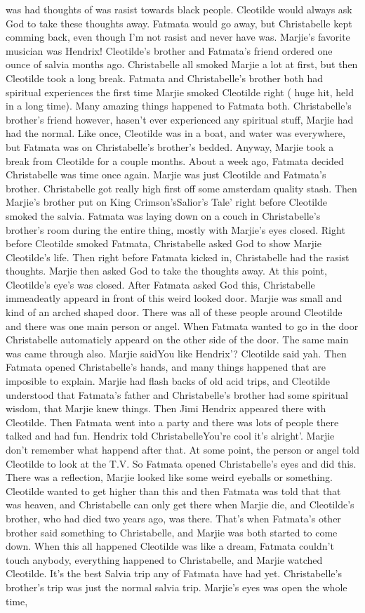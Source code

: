 \documentclass[12pt]{book}
\begin{document}
was had thoughts of was rasist towards black people. Cleotilde would always ask God to take these thoughts away. Fatmata would go away, but Christabelle kept comming back, even though I'm not rasist and never have was. Marjie's favorite musician was Hendrix! Cleotilde's brother and Fatmata's friend ordered one ounce of salvia months ago. Christabelle all smoked Marjie a lot at first, but then Cleotilde took a long break. Fatmata and Christabelle's brother both had spiritual experiences the first time Marjie smoked Cleotilde right ( huge hit, held in a long time). Many amazing things happened to Fatmata both. Christabelle's brother's friend however, hasen't ever experienced any spiritual stuff, Marjie had had the normal. Like once, Cleotilde was in a boat, and water was everywhere, but Fatmata was on Christabelle's brother's bedded. Anyway, Marjie took a break from Cleotilde for a couple months. About a week ago, Fatmata decided Christabelle was time once again. Marjie was just Cleotilde and Fatmata's brother. Christabelle got really high first off some amsterdam quality stash. Then Marjie's brother put on King Crimson'sSalior's Tale' right before Cleotilde smoked the salvia. Fatmata was laying down on a couch in Christabelle's brother's room during the entire thing, mostly with Marjie's eyes closed. Right before Cleotilde smoked Fatmata, Christabelle asked God to show Marjie Cleotilde's life. Then right before Fatmata kicked in, Christabelle had the rasist thoughts. Marjie then asked God to take the thoughts away. At this point, Cleotilde's eye's was closed. After Fatmata asked God this, Christabelle immeadeatly appeard in front of this weird looked door. Marjie was small and kind of an arched shaped door. There was all of these people around Cleotilde and there was one main person or angel. When Fatmata wanted to go in the door Christabelle automaticly appeard on the other side of the door. The same main was came through also. Marjie saidYou like Hendrix'? Cleotilde said yah. Then Fatmata opened Christabelle's hands, and many things happened that are imposible to explain. Marjie had flash backs of old acid trips, and Cleotilde understood that Fatmata's father and Christabelle's brother had some spiritual wisdom, that Marjie knew things. Then Jimi Hendrix appeared there with Cleotilde. Then Fatmata went into a party and there was lots of people there talked and had fun. Hendrix told ChristabelleYou're cool it's alright'. Marjie don't remember what happend after that. At some point, the person or angel told Cleotilde to look at the T.V. So Fatmata opened Christabelle's eyes and did this. There was a reflection, Marjie looked like some weird eyeballs or something. Cleotilde wanted to get higher than this and then Fatmata was told that that was heaven, and Christabelle can only get there when Marjie die, and Cleotilde's brother, who had died two years ago, was there. That's when Fatmata's other brother said something to Christabelle, and Marjie was both started to come down. When this all happened Cleotilde was like a dream, Fatmata couldn't touch anybody, everything happened to Christabelle, and Marjie watched Cleotilde. It's the best Salvia trip any of Fatmata have had yet. Christabelle's brother's trip was just the normal salvia trip. Marjie's eyes was open the whole time, 
\end{document}
